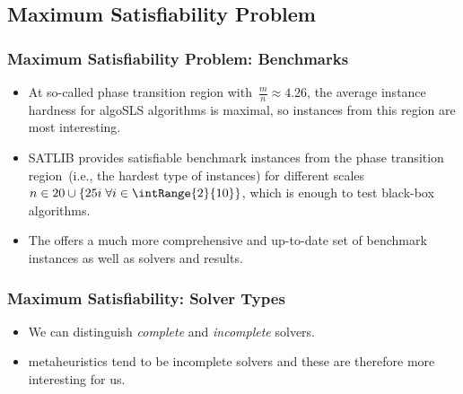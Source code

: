 \documentclass[aspectratio=169,mathserif,notheorems]{beamer}%
\begin{document}
\subsection{Maximum Satisfiability Problem}%
%
\xdef\sharedSlideTitle{Maximum Satisfiability Problem: Introduction}%
%
%
\begin{frame}%
\frametitle{Maximum Satisfiability Problem: Benchmarks}%
\begin{itemize}%
%
\item At so-called phase transition region with~$\frac{m}{n}\approx4.26$, the average instance hardness for \gls{algoSLS} algorithms is maximal\cite{HS2000SAORFROS,DNS2017TCAOEAORSkCF,DNS2015IRBFTOPOEOR3CFBOFDC}, so instances from this region are most interesting.%
%
\item<2-> \gls{SATLIB}\cite{HS2000SAORFROS,HS2001STSL} provides satisfiable benchmark instances from the phase transition region~(i.e., the hardest type of instances) for different scales~$n\in20 \cup \{25 i\; \forall i \in \intRange{2}{10}\}$, which is enough to test black-box algorithms.%
%
\item<3-> The  offers a much more comprehensive and up-to-date set of benchmark instances\cite{JVBFKMSS2026MECBC} as well as solvers and results\cite{VJBFKMSS2026ME2SBR}.
%
\end{itemize}%
\end{frame}%
%
\begin{frame}%
\frametitle{Maximum Satisfiability: Solver Types}%
\begin{itemize}%
%
\item We can distinguish \emph{complete} and \emph{incomplete}  solvers\cite{GKSS2008SS}.%
%
\item<5-> \Glspl{metaheuristic} tend to be incomplete solvers and these are therefore more interesting for us.%
\end{itemize}%
\end{frame}%
\end{document}
